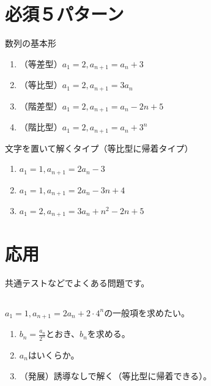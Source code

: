 \documentclass[12pt,a4paper]{jsarticle}
\begin{document}
\section{必須５パターン}
数列の基本形
\begin{enumerate}
    \item （等差型）$a_1=2, a_{n+1}=a_n +3$
    \item （等比型）$a_1=2, a_{n+1}=3 a_n$
    \item （階差型）$a_1=2, a_{n+1}=a_n -2n+5$
    \item （階比型）$a_1=2, a_{n+1}=a_n +3^n$
\end{enumerate}
文字を置いて解くタイプ（等比型に帰着タイプ）
\begin{enumerate}
    \item $a_1=1, a_{n+1}=2 a_n -3$
    \item $a_1=1, a_{n+1}=2 a_n -3n+4$
    \item $a_1=2, a_{n+1}=3a_n+n^2 -2n +5$
\end{enumerate}
\section{応用}
共通テストなどでよくある問題です。
\subsection{}
$a_1=1,a_{n+1}=2a_{n}+2\cdot 4^n$の一般項を求めたい。
\begin{enumerate}
    \item $b_n=\frac{a_n}{2^n}$とおき、$b_n$を求める。
    \item $a_n$はいくらか。
    \item （発展）誘導なしで解く（等比型に帰着できる）。
\end{enumerate}
\end{document}

